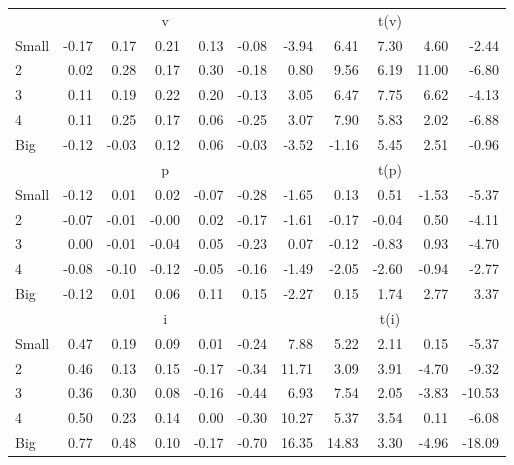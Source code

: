 \begin{table}[!ht]
\begin{tabular}{lrrrrrrrrrr}
  
    
      & \multicolumn{5}{c}{v} & \multicolumn{5}{c}{t(v)}
    
    \\
      \cmidrule(r){2-6} \cmidrule(r){7-11}

    Small   & -0.17  & 0.17  & 0.21  & 0.13  & -0.08  & -3.94  & 6.41  & 7.30  & 4.60  & -2.44  \\
         2  & 0.02  & 0.28  & 0.17  & 0.30  & -0.18  & 0.80  & 9.56  & 6.19  & 11.00  & -6.80  \\
         3  & 0.11  & 0.19  & 0.22  & 0.20  & -0.13  & 3.05  & 6.47  & 7.75  & 6.62  & -4.13  \\
         4  & 0.11  & 0.25  & 0.17  & 0.06  & -0.25  & 3.07  & 7.90  & 5.83  & 2.02  & -6.88  \\
    Big     & -0.12  & -0.03  & 0.12  & 0.06  & -0.03  & -3.52  & -1.16  & 5.45  & 2.51  & -0.96  \\

  
    
      & \multicolumn{5}{c}{p} & \multicolumn{5}{c}{t(p)}
    
    \\
      \cmidrule(r){2-6} \cmidrule(r){7-11}

    Small   & -0.12  & 0.01  & 0.02  & -0.07  & -0.28  & -1.65  & 0.13  & 0.51  & -1.53  & -5.37  \\
         2  & -0.07  & -0.01  & -0.00  & 0.02  & -0.17  & -1.61  & -0.17  & -0.04  & 0.50  & -4.11  \\
         3  & 0.00  & -0.01  & -0.04  & 0.05  & -0.23  & 0.07  & -0.12  & -0.83  & 0.93  & -4.70  \\
         4  & -0.08  & -0.10  & -0.12  & -0.05  & -0.16  & -1.49  & -2.05  & -2.60  & -0.94  & -2.77  \\
    Big     & -0.12  & 0.01  & 0.06  & 0.11  & 0.15  & -2.27  & 0.15  & 1.74  & 2.77  & 3.37  \\

  
    
      & \multicolumn{5}{c}{i} & \multicolumn{5}{c}{t(i)}
    
    \\
      \cmidrule(r){2-6} \cmidrule(r){7-11}

    Small   & 0.47  & 0.19  & 0.09  & 0.01  & -0.24  & 7.88  & 5.22  & 2.11  & 0.15  & -5.37  \\
         2  & 0.46  & 0.13  & 0.15  & -0.17  & -0.34  & 11.71  & 3.09  & 3.91  & -4.70  & -9.32  \\
         3  & 0.36  & 0.30  & 0.08  & -0.16  & -0.44  & 6.93  & 7.54  & 2.05  & -3.83  & -10.53  \\
         4  & 0.50  & 0.23  & 0.14  & 0.00  & -0.30  & 10.27  & 5.37  & 3.54  & 0.11  & -6.08  \\
    Big     & 0.77  & 0.48  & 0.10  & -0.17  & -0.70  & 16.35  & 14.83  & 3.30  & -4.96  & -18.09  \\


  \bottomrule
\end{tabular}
\label{tbl:25_Size_Inv}
\end{table}